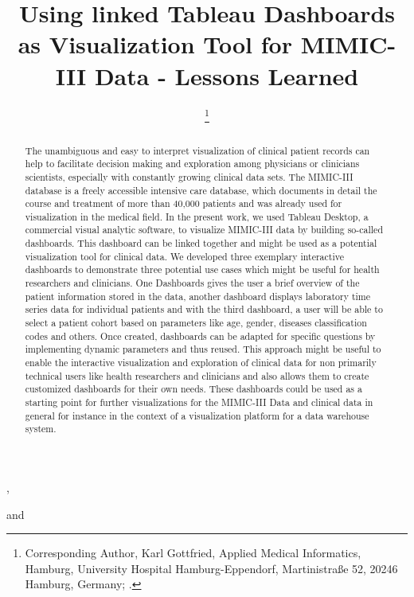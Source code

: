 \documentclass[aac]{iosart2x}
\begin{document}
\begin{frontmatter}

{\centering \title{Using linked Tableau Dashboards as Visualization Tool for MIMIC-III Data - Lessons Learned
}}


\author[A]{ %
\thanks{Corresponding Author, Karl Gottfried, Applied Medical Informatics, Hamburg, University Hospital Hamburg-Eppendorf, Martinistraße 52, 20246 Hamburg, Germany;  .}},
\author[A]{ }
and
\author[A]{ }
\address[A]{Applied Medical Informatics, , Germany, ,
}


\begin{abstract}
%
The unambiguous and easy to interpret visualization of clinical patient records can help to facilitate decision making and exploration among physicians or clinicians scientists, especially with constantly growing clinical data sets. The MIMIC-III database is a freely accessible intensive care database, which documents in detail the course and treatment of more than 40,000 patients and was already used for visualization in the medical field. In the present work, we used Tableau Desktop, a commercial visual analytic software, to visualize MIMIC-III data by building so-called dashboards. This dashboard can be linked together and might be used as a potential visualization tool for clinical data. We developed three exemplary interactive dashboards to demonstrate three potential use cases which might be useful for health researchers and clinicians. One Dashboards gives the user a brief overview of the patient information stored in the data, another dashboard displays laboratory time series data for individual patients and with the third dashboard, a user will be able to select a patient cohort based on parameters like age, gender, diseases classification codes and others. Once created, dashboards can be adapted for specific questions by implementing dynamic parameters and thus reused. This approach might be useful to enable the interactive visualization and exploration of clinical data for non primarily technical users like health researchers and clinicians and also allows them to create customized dashboards for their own needs. These dashboards could be used as a starting point for further visualizations for the MIMIC-III Data and clinical data in general for instance in the context of a visualization platform for a data warehouse system. 
\end{abstract}


\end{frontmatter}
\end{document}
